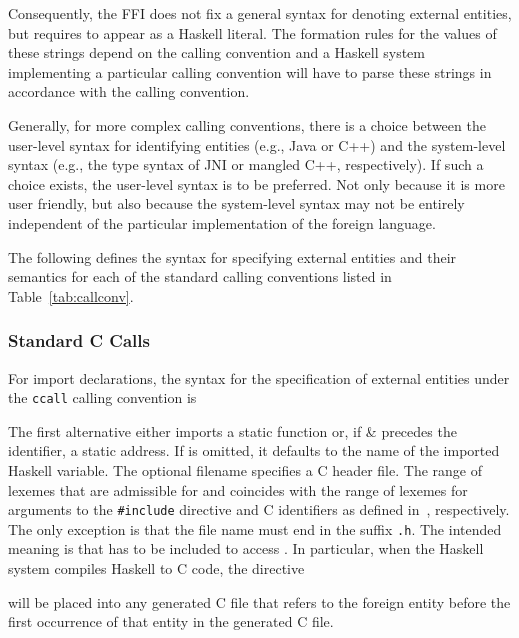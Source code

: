\documentclass[a4paper,twosides]{article}
\newcommand{\code}[1]{\texttt{#1}}
\begin{document}
Consequently, the FFI does not fix a general syntax for denoting external
entities, but requires  to appear as a Haskell 
literal.  The formation rules for the values of these strings depend on the
calling convention and a Haskell system implementing a particular calling
convention will have to parse these strings in accordance with the calling
convention.

Generally, for more complex calling conventions, there is a choice between the
user-level syntax for identifying entities (e.g., Java or C{+}{+}) and the
system-level syntax (e.g., the type syntax of JNI or mangled C{+}{+},
respectively).  If such a choice exists, the user-level syntax is to be
preferred.  Not only because it is more user friendly, but also because the
system-level syntax may not be entirely independent of the particular
implementation of the foreign language.

The following defines the syntax for specifying external entities and their
semantics for each of the standard calling conventions listed in
Table~\ref{tab:callconv}.

\subsubsection{Standard C Calls}
\label{sec:ccall}

For import declarations, the syntax for the specification of external entities
under the \code{ccall} calling convention is
%
\begin{grammar}
  \grule{fname}{%
    \gverbal{file name with suffix `\code{.h}'}}
\end{grammar}
%
The first alternative either imports a static function  or, if
\gterm\& precedes the identifier, a static address.  If  is
omitted, it defaults to the name of the imported Haskell variable.  The
optional filename  specifies a C header file.  The range of
lexemes that are admissible for  and  coincides with
the range of lexemes for arguments to the \code{\#{}include} directive and C
identifiers as defined in~\cite{C}, respectively.  The only exception is that
the file name  must end in the suffix \code{.h}.  The intended
meaning is that  has to be included to access .  In
particular, when the Haskell system compiles Haskell to C code, the directive
%
\begin{quote}
\end{quote}
%
will be placed into any generated C file that refers to the foreign entity
before the first occurrence of that entity in the generated C file.
\end{document}
